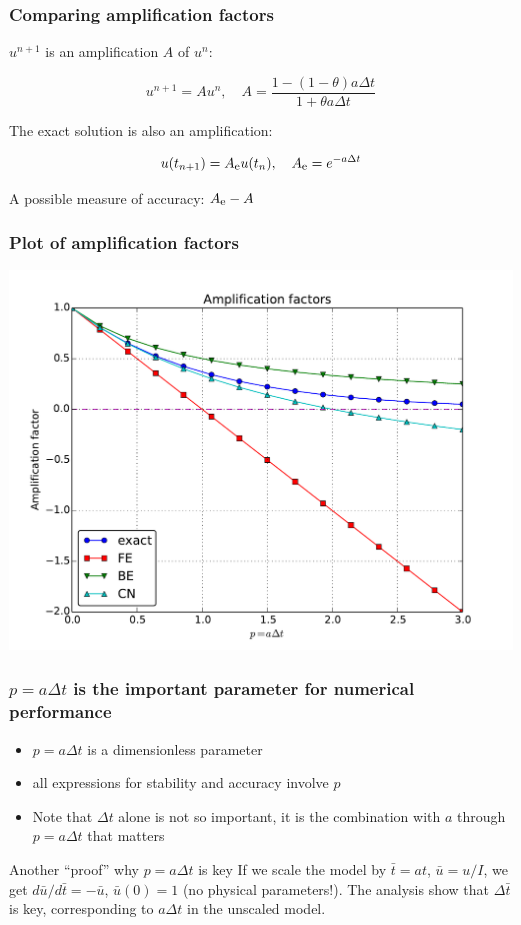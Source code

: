 \documentclass{beamer}
\begin{document}
\begin{frame}
\frametitle{Comparing amplification factors}

$u^{n+1}$ is an amplification $A$ of $u^n$:

\[ u^{n+1} = Au^n,\quad A = \frac{1 - (1-\theta) a\Delta t}{1 + \theta a\Delta t} \]

The exact solution is also an amplification:

\[ u(t_{n+1}) = \Aex u(t_n), \quad \Aex = e^{-a\Delta t}\]

A possible measure of accuracy: $\Aex - A$
\end{frame}

\begin{frame}
\frametitle{Plot of amplification factors}

\centerline{\includegraphics[width=0.9\linewidth]{fig-analysis/A_factors.pdf}}
\end{frame}

\begin{frame}
\frametitle{$p=a\Delta t$ is the important parameter for numerical performance}

\begin{itemize}
 \item $p=a\Delta t$ is a dimensionless parameter

 \item all expressions for stability and accuracy involve $p$

 \item Note that $\Delta t$ alone is not so important, it is the
   combination with $a$ through $p=a\Delta t$ that matters
\end{itemize}

\noindent
\begin{block}{Another ``proof'' why $p=a\Delta t$ is key }
If we scale the model
by $\bar t=at$, $\bar u=u/I$, we get
$d\bar u/d\bar t = -\bar u$, $\bar u(0)=1$ (no physical parameters!).
The analysis show that $\Delta \bar t$ is key, corresponding to
$a\Delta t$ in the unscaled model.
\end{block}
\end{frame}
\end{document}
